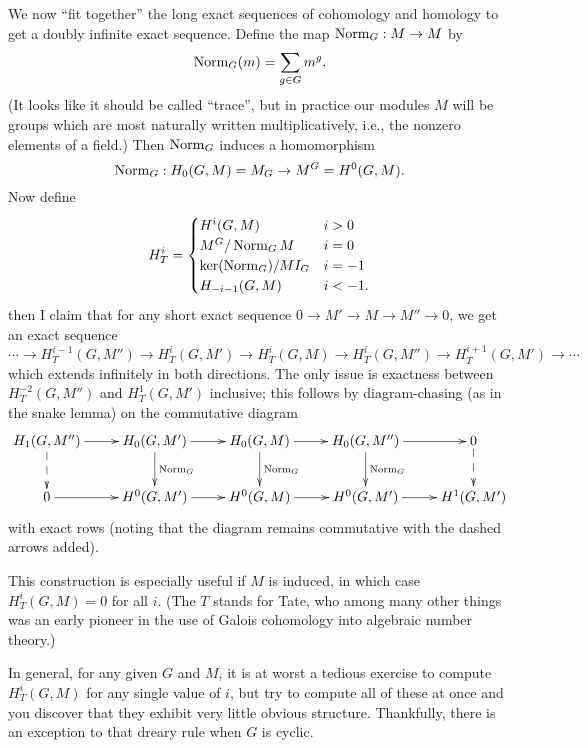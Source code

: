 We now ``fit together'' the long exact sequences of cohomology and homology
to get a doubly infinite exact sequence. Define the map $\operatorname{Norm}_G: M \to M$
by
\[
\operatorname{Norm}_G(m) = \sum_{g \in G} m^g.
\]
(It looks like it should be called
``trace'', but in practice our modules $M$ will be groups which are most
naturally written multiplicatively, i.e., the nonzero elements of a field.)
Then $\operatorname{Norm}_G$ induces a homomorphism
\[
\operatorname{Norm}_G: H_0(G,M) = M_G \to M^G = H^0(G,M).
\]
Now define
\[
H_T^i = \begin{cases}
H^i(G, M) & i > 0 \\
M^G/\operatorname{Norm}_G M & i=0 \\
\ker(\operatorname{Norm}_G)/MI_G & i=-1 \\
H_{-i-1}(G,M) & i<-1.
\end{cases}
\]
then I claim that for any short exact sequence $0 \to M' \to M \to M'' \to 0$,
we get an exact sequence
\[
\cdots
\to H^{i-1}_T(G, M'') \to H^i_T(G, M') \to H^i_T(G, M) \to H^i_T(G, M'')
\to H^{i+1}_T(G, M') \to \cdots
\]
which extends infinitely in both directions. 
The only issue is exactness between $H^{-2}_T(G, M'')$ and $H^1_T(G, M')$ inclusive;
this follows by diagram-chasing (as in the snake lemma) on the commutative diagram
\[
\xymatrix{
H_1(G, M'') \ar[r] \ar@{-->}[d] & H_0(G, M') \ar[r] \ar^{\Norm_G}[d] & 
H_0(G, M) \ar[r] \ar^{\Norm_G}[d] & H_0(G, M'') \ar[r] \ar^{\Norm_G}[d] & 0 \ar@{-->}[d] \\
0 \ar[r] & H^0(G, M') \ar[r]  & H^0(G, M) \ar[r] & 
H^0(G, M') \ar[r] & H^1(G, M')
}
\]
with exact rows (noting that the diagram remains commutative with the dashed arrows added).

This construction is especially useful if $M$ is induced, in which case $H^i_T(G,M) = 0$ for all $i$.
(The $T$ stands for Tate, who among many other things was an early pioneer
in the use of Galois cohomology into algebraic number theory.)


In general, for any given $G$ and $M$, it is at worst a tedious exercise
to compute $H^i_T(G,M)$ for any single value of $i$, but try to compute
all of these at once and you discover that they exhibit very little obvious
structure. Thankfully, there is an exception to that dreary rule when
$G$ is cyclic.


